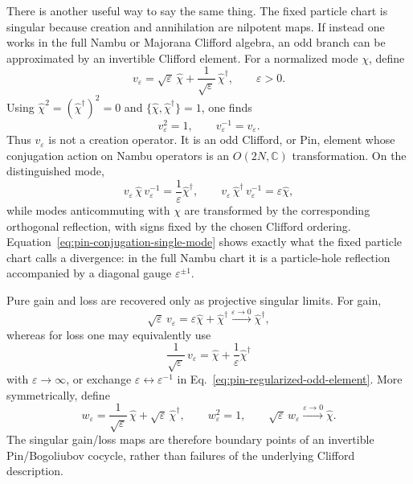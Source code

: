 \documentclass[aps,prb,onecolumn,nofootinbib,superscriptaddress]{revtex4-2}
\theoremstyle{plain}
\theoremstyle{definition}
\begin{document}
There is another useful way to say the same thing.  The fixed particle chart is
singular because creation and annihilation are nilpotent maps.  If instead one
works in the full Nambu or Majorana Clifford algebra, an odd branch can be
approximated by an invertible Clifford element.  For a normalized mode
\(\chi\), define
\begin{equation}
  v_\varepsilon
  =
  \sqrt{\varepsilon}\,\hat\chi
  +
  \frac{1}{\sqrt{\varepsilon}}\,\hat\chi^\dagger,
  \qquad
  \varepsilon>0 .
  \label{eq:pin-regularized-odd-element}
\end{equation}
Using \(\hat\chi^2=(\hat\chi^\dagger)^2=0\) and
\(\{\hat\chi,\hat\chi^\dagger\}=1\), one finds
\begin{equation}
  v_\varepsilon^2=1,
  \qquad
  v_\varepsilon^{-1}=v_\varepsilon .
  \label{eq:pin-element-invertible}
\end{equation}
Thus \(v_\varepsilon\) is not a creation operator.  It is an odd Clifford, or
Pin, element whose conjugation action on Nambu operators is an
\(O(2N,\mathbb C)\) transformation.  On the distinguished mode,
\begin{equation}
  v_\varepsilon\,\hat\chi\,v_\varepsilon^{-1}
  =
  \frac{1}{\varepsilon}\hat\chi^\dagger,
  \qquad
  v_\varepsilon\,\hat\chi^\dagger\,v_\varepsilon^{-1}
  =
  \varepsilon \hat\chi ,
  \label{eq:pin-conjugation-single-mode}
\end{equation}
while modes anticommuting with \(\chi\) are transformed by the corresponding
orthogonal reflection, with signs fixed by the chosen Clifford ordering.
Equation~\eqref{eq:pin-conjugation-single-mode} shows exactly what the fixed
particle chart calls a divergence: in the full Nambu chart it is a
particle-hole reflection accompanied by a diagonal gauge
\(\varepsilon^{\pm1}\).

Pure gain and loss are recovered only as projective singular limits.  For
gain,
\begin{equation}
  \sqrt{\varepsilon}\,v_\varepsilon
  =
  \varepsilon\hat\chi+\hat\chi^\dagger
  \xrightarrow{\varepsilon\to0}
  \hat\chi^\dagger ,
  \label{eq:pin-gain-limit}
\end{equation}
whereas for loss one may equivalently use
\begin{equation}
  \frac{1}{\sqrt{\varepsilon}}\,v_\varepsilon
  =
  \hat\chi+\frac{1}{\varepsilon}\hat\chi^\dagger
  \label{eq:pin-loss-bad-scaling}
\end{equation}
with \(\varepsilon\to\infty\), or exchange
\(\varepsilon\leftrightarrow\varepsilon^{-1}\) in
Eq.~\eqref{eq:pin-regularized-odd-element}.  More symmetrically, define
\begin{equation}
  w_\varepsilon
  =
  \frac{1}{\sqrt{\varepsilon}}\,\hat\chi
  +
  \sqrt{\varepsilon}\,\hat\chi^\dagger ,
  \qquad
  w_\varepsilon^2=1,
  \qquad
  \sqrt{\varepsilon}\,w_\varepsilon
  \xrightarrow{\varepsilon\to0}
  \hat\chi .
  \label{eq:pin-loss-limit}
\end{equation}
The singular gain/loss maps are therefore boundary points of an invertible
Pin/Bogoliubov cocycle, rather than failures of the underlying Clifford
description.
\end{document}

